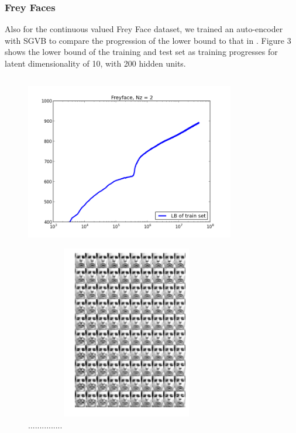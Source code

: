 \documentclass{article}
\begin{document}
\subsubsection{Frey Faces}

Also for the continuous valued Frey Face dataset, we trained an auto-encoder with SGVB to compare the progression of the lower bound to that in \cite{kingma2013auto}. Figure 3 shows the lower bound of the training and test set as training progresses for latent dimensionality of 10, with 200 hidden units.

\begin{figure}[htb]
\centering
\begin{minipage}{0.5\textwidth}
\includegraphics[height=3in,width=3.6in]{lowerboundFF.png}
\caption{...............}
\end{minipage}%
\centering
\begin{minipage}{0.5\textwidth}
\includegraphics[height=3in,width=3.5in]{manifoldFF.png}\caption{...............}
\end{minipage}
\end{figure}
\end{document}
